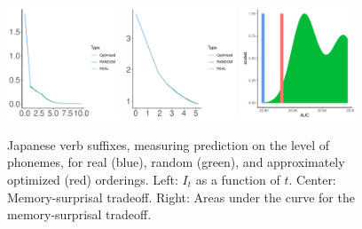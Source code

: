 \documentclass[11pt,letterpaper]{article}
\begin{document}
\begin{figure}
	\begin{center}
		\includegraphics[width=0.3\textwidth]{../code/ngram-control/create_models_ngrams/morph/Japanese/tradeoffs/figures/Japanese-suffixes-byPhonemes-it.pdf}
		\includegraphics[width=0.3\textwidth]{../code/ngram-control/create_models_ngrams/morph/Japanese/tradeoffs/figures/Japanese-suffixes-byPhonemes-memsurp.pdf}
		\includegraphics[width=0.3\textwidth]{../code/ngram-control/create_models_ngrams/morph/Japanese/tradeoffs/figures/Japanese-suffixes-byPhonemes-auc-hist.pdf}
\end{center}
	\caption{Japanese verb suffixes, measuring prediction on the level of phonemes, for real (blue), random (green), and approximately optimized (red) orderings. Left: $I_t$ as a function of $t$. Center: Memory-surprisal tradeoff. Right: Areas under the curve for the memory-surprisal tradeoff.}\label{fig:jap-phon}
\end{figure}
\end{document}
